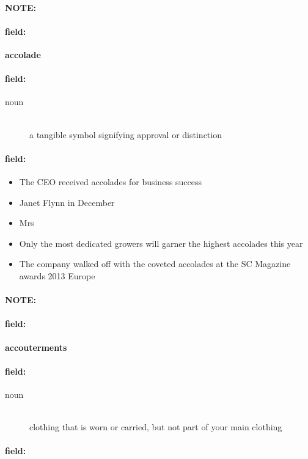 \documentclass[12pt]{article}
\newenvironment{note}{\paragraph{NOTE:}}{}
\newenvironment{field}{\paragraph{field:}}{}
\begin{document}
\begin{note}
\begin{field}
\textbf{\large accolade}
\end{field}


\begin{field}
\begin{description}
\item[noun] \hfill \\ 
a tangible symbol signifying approval or distinction

\end{description}
\end{field}

\begin{field}
\begin{itemize}
\item The CEO received accolades for business success
\item  Janet Flynn in December
\item Mrs
\item Only the most dedicated growers will garner the highest accolades this year
\item The company walked off with the coveted accolades at the SC Magazine awards 2013 Europe
\end{itemize}
\end{field}
\end{note}
\begin{note}
\begin{field}
\textbf{\large accouterments}
\end{field}


\begin{field}
\begin{description}
\item[noun] \hfill \\ 
clothing that is worn or carried, but not part of your main clothing

\end{description}
\end{field}

\begin{field}
\end{field}
\end{note}
\end{document}
